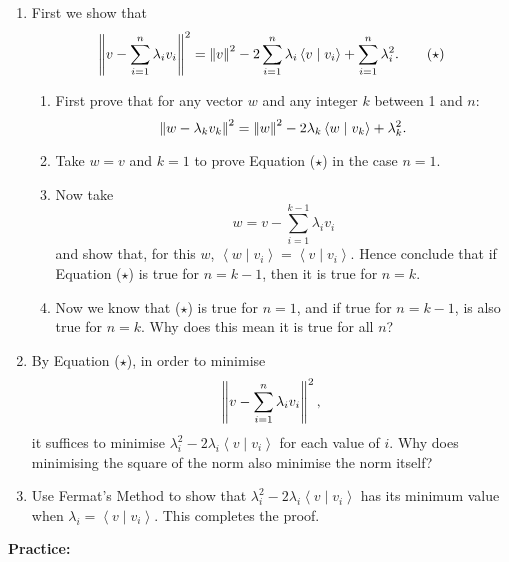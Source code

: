 \documentclass{article}
\newcommand{\norm}[1]{\left|\kern-1pt\left|#1\right|\kern-1pt\right|}
\newcommand{\braket}[2]{\left\langle #1 \mid #2 \right\rangle}
\begin{document}
 \begin{enumerate}
 	\item First we show that
 		\begin{equation}
 			\norm{v-\sum_{i=1}^n \lambda_iv_i}^2=\norm{v}^2 - 2 \sum_{i=1}^n \lambda_i\braket{v}{v_i} + \sum_{i=1}^n \lambda_i^2 .\tag{$\star$}
		\end{equation}
 		\begin{enumerate}
 			\item First prove that for any vector $w$ and any integer $k$ between 1 and $n$:
 				\[\norm{w-\lambda_kv_k}^2=\norm{w}^2-2\lambda_k\braket{w}{v_k} + \lambda_k^2.\]
			\item Take $w=v$ and $k=1$ to prove Equation ($\star$) in the case $n=1$.
			\item Now take
				\[w = v-\sum_{i=1}^{k-1}\lambda_i v_i\]
				and show that, for this $w$, $\braket{w}{v_i}=\braket{v}{v_i}$. Hence conclude that if Equation ($\star$) is true for $n=k-1$, then it is true for $n=k$.
			\item Now we know that ($\star$) is true for $n=1$, and if true for $n=k-1$, is also true for $n=k$. Why does this mean it is true for all $n$?
 		\end{enumerate}
	\item By Equation ($\star$), in order to minimise
		\[\norm{v-\sum_{i=1}^n \lambda_iv_i}^2,\]
		it suffices to minimise $\lambda_i^2-2\lambda_i\braket{v}{v_i}$ for each value of $i$. Why does minimising the square of the norm also minimise the norm itself?
	\item Use Fermat's Method to show that $\lambda_i^2-2\lambda_i\braket{v}{v_i}$ has its minimum value when $\lambda_i=\braket{v}{v_i}$. This completes the proof.
\end{enumerate}
	
	
	
	
	
	




\clearpage

\textbf{Practice:}\bigskip
\end{document}
